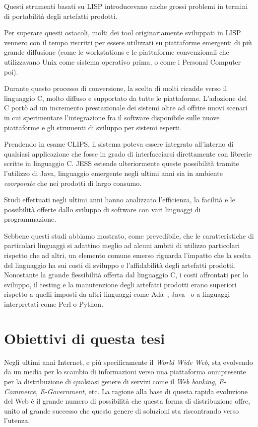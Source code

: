 Questi strumenti basati su LISP introducevano anche grossi problemi in termini di portabilità degli artefatti prodotti.~\cite{clipsarch1992}

Per superare questi ostacoli, molti dei tool originariamente sviluppati in LISP vennero con il tempo riscritti per essere utilizzati su piattaforme emergenti di più grande diffusione (come le workstations e le piattaforme convenzionali che utilizzavano Unix come sistema operativo prima, o come i Personal Computer poi).

Durante questo processo di conversione, la scelta di molti ricadde verso il linguaggio C, molto diffuso e supportato da tutte le piattaforme. L'adozione del C portò ad un incremento prestazionale dei sistemi oltre ad offrire nuovi scenari in cui sperimentare l'integrazione fra il software disponibile sulle nuove piattaforme e gli strumenti di sviluppo per sistemi esperti.

Prendendo in esame CLIPS, il sistema poteva essere integrato all'interno di qualsiasi applicazione che fosse in grado di interfacciarsi direttamente con librerie scritte in linguaggio C. JESS estende ulteriormente queste possibilità tramite l'utilizzo di Java, linguaggio emergente negli ultimi anni sia in ambiente \emph{coorporate} che nei prodotti di largo consumo.

Studi effettuati negli ultimi anni hanno analizzato l'efficienza, la facilità e le possibilità offerte dallo sviluppo di software con vari linguaggi di programmazione.~\cite{naiditch1999}~\cite{Zeigler_95}~\cite{prechelt2000}~\cite{prashant2008}

Sebbene questi studi abbiamo mostrato, come prevedibile, che le caratteristiche di particolari linguaggi si adattino meglio ad alcuni ambiti di utilizzo particolari rispetto che ad altri, un elemento comune emerso riguarda l'impatto che la scelta del linguaggio ha sui costi di sviluppo e l'affidabilità degli artefatti prodotti. Nonostante la grande flessibilità offerta dal linguaggio C, i costi affrontati per lo sviluppo, il testing e la manutenzione degli artefatti prodotti erano superiori rispetto a quelli imposti da altri linguaggi come Ada~\cite{Zeigler_95}, Java~\cite{prashant2008} o a linguaggi interpretati come Perl o Python\cite{prechelt2000}.

\section{Obiettivi di questa tesi}
Negli ultimi anni Internet, e più specificamente il \emph{World Wide Web}, sta evolvendo da un media per lo scambio di informazioni verso una piattaforma onnipresente per la distribuzione di qualsiasi genere di servizi come il \emph{Web banking}, \emph{E-Commerce}, \emph{E-Government}, etc. La ragione alla base di questa rapida evoluzione del Web è il grande numero di possibilità che questa forma di distribuzione offre, unito al grande successo che questo genere di soluzioni sta riscontrando verso l'utenza.

